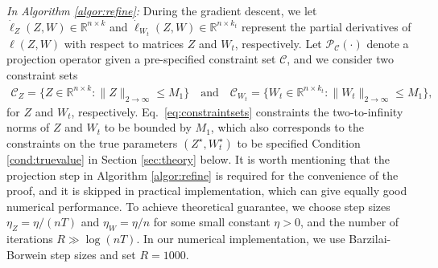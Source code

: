 \documentclass[12pt]{article}
\newcommand{\blue}[1]{\textcolor{blue}{#1}}
\newtheorem{remark}{Remark}
\begin{document}


 \emph{In Algorithm \ref{algor:refine}:} 
During the gradient descent, we let $\dot{\ell}_{Z}(Z,W) \in \mathbb{R}^{n\times k}$ and $\dot{\ell}_{W_t}(Z,W)\in \mathbb{R}^{n\times k_t}$ represent the partial derivatives of $\ell(Z,W)$ with respect to matrices $Z $ and $ W_t$, respectively.  Let  $\mathcal{P}_{\mathcal{C}}(\cdot)$ denote a projection operator given a pre-specified  constraint set $\mathcal{C}$, and  we consider two constraint sets 
\begin{align}\label{eq:constraintsets}
    \mathcal{C}_Z = \big\{Z \in \mathbb R^{n\times k }: \|Z\|_{2 \to \infty} \leqslant M_1\big\} \quad\text{and}\quad \mathcal{C}_{W_t} = \big\{W_t \in \mathbb R^{n\times k_t }: \|W_t\|_{2 \to \infty} \leqslant M_1\big\},
\end{align}
for $Z$ and $W_t$, respectively. 
Eq.\ \eqref{eq:constraintsets} constraints the two-to-infinity norms of $Z$ and $W_t$ to be  bounded by $M_1$, which also  
  corresponds to the constraints on the true parameters $(Z^{\star}, W_t^{\star})$ to be specified Condition \ref{cond:truevalue} in Section \ref{sec:theory} below. 
It is worth mentioning that the projection step in Algorithm \ref{algor:refine} is required for the convenience of the proof, and it is skipped in practical implementation, which can give  equally good numerical performance. 
 To achieve theoretical guarantee, we choose step sizes $ \eta_Z = \eta/(nT)$ and $\eta_W = \eta/n$ for some small constant $\eta > 0$, and the number of iterations $R \gg \log(nT)$. 
In our numerical implementation, we use Barzilai-Borwein step sizes \citep{barzilai1988two} and set $R = 1000$. %
\end{document}
